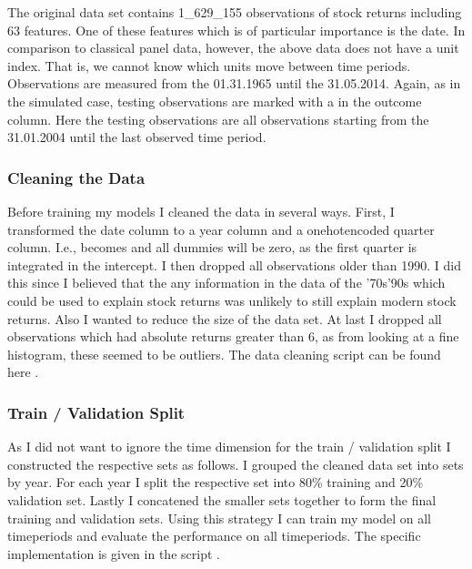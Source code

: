 \documentclass[letterpaper,10pt,english]{sphinxmanual}
\begin{document}
The original data set contains 1\_629\_155 observations of stock returns including 63 features. One of these features which is of particular importance is the date. In comparison to classical panel data, however, the above data does not have a unit index. That is, we cannot know which units move between time periods. Observations are measured from the 01.31.1965 until the 31.05.2014. Again, as in the simulated case, testing observations are marked with a  in the outcome column. Here the testing observations are all observations starting from the 31.01.2004 until the last observed time period.


\subsubsection{Cleaning the Data}
\label{\detokenize{stock_intro:cleaning-the-data}}
Before training my models I cleaned the data in several ways. First, I transformed the date column to a year column and a one\sphinxhyphen{}hot\sphinxhyphen{}encoded quarter column. I.e.,  becomes  and all dummies will be zero, as the first quarter is integrated in the intercept. I then dropped all observations older than 1990. I did this since I believed that the any information in the data of the ’70s\sphinxhyphen{}’90s which could be used to explain stock returns was unlikely to still explain modern stock returns. Also I wanted to reduce the size of the data set. At last I dropped all observations which had absolute returns greater than 6, as from looking at a fine histogram, these seemed to be outliers. The data cleaning script can be found here .


\subsubsection{Train / Validation Split}
\label{\detokenize{stock_intro:train-validation-split}}
As I did not want to ignore the time dimension for the train / validation split I constructed the respective sets as follows. I grouped the cleaned data set into sets by year. For each year I split the respective set into 80\% training and 20\% validation set. Lastly I concatened the smaller sets together to form the final training and validation sets. Using this strategy I can train my model on all time\sphinxhyphen{}periods and evaluate the performance on all time\sphinxhyphen{}periods. The specific implementation is given in the script .
\end{document}

